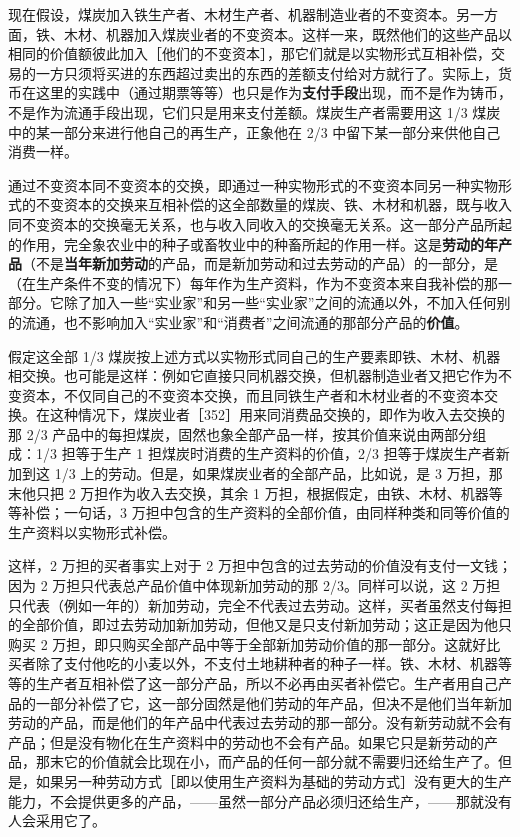 现在假设，煤炭加入铁生产者、木材生产者、机器制造业者的不变资本。另一方面，铁、木材、机器加入煤炭业者的不变资本。这样一来，既然他们的这些产品以相同的价值额彼此加入［他们的不变资本］，那它们就是以实物形式互相补偿，交易的一方只须将买进的东西超过卖出的东西的差额支付给对方就行了。实际上，货币在这里的实践中（通过期票等等）也只是作为\textbf{支付手段}出现，而不是作为铸币，不是作为流通手段出现，它们只是用来支付差额。煤炭生产者需要用这 1/3 煤炭中的某一部分来进行他自己的再生产，正象他在 2/3 中留下某一部分来供他自己消费一样。

通过不变资本同不变资本的交换，即通过一种实物形式的不变资本同另一种实物形式的不变资本的交换来互相补偿的这全部数量的煤炭、铁、木材和机器，既与收入同不变资本的交换毫无关系，也与收入同收入的交换毫无关系。这一部分产品所起的作用，完全象农业中的种子或畜牧业中的种畜所起的作用一样。这是\textbf{劳动的年产品}（不是\textbf{当年新加劳动}的产品，而是新加劳动和过去劳动的产品）的一部分，是（在生产条件不变的情况下）每年作为生产资料，作为不变资本来自我补偿的那一部分。它除了加入一些“实业家”和另一些“实业家”之间的流通以外，不加入任何别的流通，也不影响加入“实业家”和“消费者”之间流通的那部分产品的\textbf{价值}。

假定这全部 1/3 煤炭按上述方式以实物形式同自己的生产要素即铁、木材、机器相交换。\fontbox{~\{}也可能是这样：例如它直接只同机器交换，但机器制造业者又把它作为不变资本，不仅同自己的不变资本交换，而且同铁生产者和木材业者的不变资本交换。\fontbox{\}~}在这种情况下，煤炭业者［352］用来同消费品交换的，即作为收入去交换的那 2/3 产品中的每担煤炭，固然也象全部产品一样，按其价值来说由两部分组成：1/3 担等于生产 1 担煤炭时消费的生产资料的价值，2/3 担等于煤炭生产者新加到这 1/3 上的劳动。但是，如果煤炭业者的全部产品，比如说，是 3 万担，那末他只把 2 万担作为收入去交换，其余 1 万担，根据假定，由铁、木材、机器等等补偿；一句话，3 万担中包含的生产资料的全部价值，由同样种类和同等价值的生产资料以实物形式补偿。

这样，2 万担的买者事实上对于 2 万担中包含的过去劳动的价值没有支付一文钱；因为 2 万担只代表总产品价值中体现新加劳动的那 2/3。同样可以说，这 2 万担只代表（例如一年的）新加劳动，完全不代表过去劳动。这样，买者虽然支付每担的全部价值，即过去劳动加新加劳动，但他又是只支付新加劳动；这正是因为他只购买 2 万担，即只购买全部产品中等于全部新加劳动价值的那一部分。这就好比买者除了支付他吃的小麦以外，不支付土地耕种者的种子一样。铁、木材、机器等等的生产者互相补偿了这一部分产品，所以不必再由买者补偿它。生产者用自己产品的一部分补偿了它，这一部分固然是他们劳动的年产品，但决不是他们当年新加劳动的产品，而是他们的年产品中代表过去劳动的那一部分。没有新劳动就不会有产品；但是没有物化在生产资料中的劳动也不会有产品。如果它只是新劳动的产品，那末它的价值就会比现在小，而产品的任何一部分就不需要归还给生产了。但是，如果另一种劳动方式［即以使用生产资料为基础的劳动方式］没有更大的生产能力，不会提供更多的产品，——虽然一部分产品必须归还给生产，——那就没有人会采用它了。

